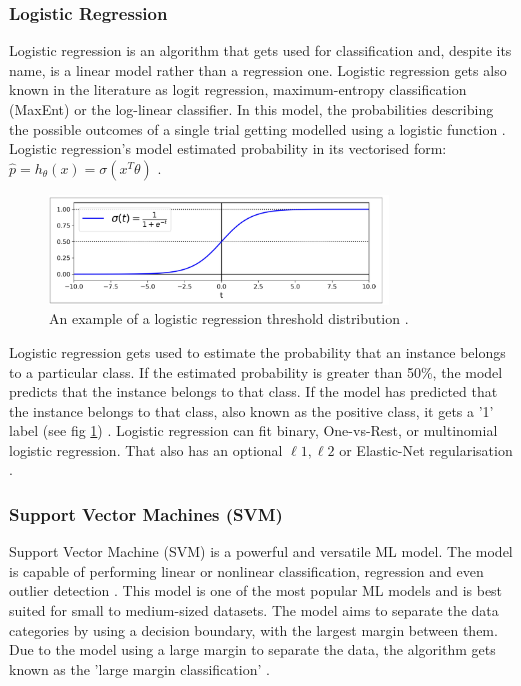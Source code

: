 	\subsubsection{Logistic Regression}
	
	Logistic regression is an algorithm that gets used for classification and, despite its name, is a linear model rather than a regression one. Logistic regression gets also known in the literature as logit regression, maximum-entropy classification (MaxEnt) or the log-linear classifier. In this model, the probabilities describing the possible outcomes of a single trial getting modelled using a logistic function \cite{sklearn_lr, handson_book}. Logistic regression's model estimated probability in its vectorised form: $\hat{p}=h_\theta(x) = \sigma(x^T\theta)$ \cite{geron2019hands}.
	
	\begin{figure}[t]
		\begin{center}
			\includegraphics[width=9cm]{graphics/logistic_reg.jpeg}
			\caption{An example of a logistic regression threshold distribution \cite{geron2019hands}.}
			\label{fig:logr_example}
		\end{center}
		
	\end{figure}
	
	Logistic regression gets used to estimate the probability that an instance belongs to a particular class. If the estimated probability is greater than 50\%, the model predicts that the instance belongs to that class. If the model has predicted that the instance belongs to that class, also known as the positive class, it gets a '1' label  (see fig \ref{fig:logr_example}) \cite{geron2019hands}. Logistic regression can fit binary, One-vs-Rest, or multinomial logistic regression. That also has an optional $\ell1, \ell2$ or Elastic-Net regularisation \cite{sklearn_lr}.
	
	\subsubsection{Support Vector Machines (SVM)}
	Support Vector Machine (SVM) is a powerful and versatile ML model. The model is capable of performing linear or nonlinear classification, regression and even outlier detection \cite{geron2019hands, sklearn_svm}. This model is one of the most popular ML models and is best suited for small to medium-sized datasets. The model aims to separate the data categories by using a decision boundary, with the largest margin between them. Due to the model using a large margin to separate the data, the algorithm gets known as the 'large margin classification' \cite{geron2019hands}.
	
